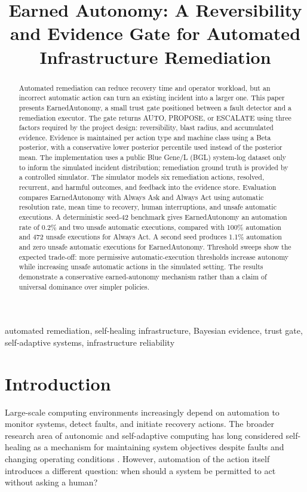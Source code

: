 \documentclass[conference]{IEEEtran}
\title{Earned Autonomy: A Reversibility and Evidence Gate for Automated Infrastructure Remediation}
\author{
\IEEEauthorblockN{Aman Das}
\IEEEauthorblockA{
Earned Autonomy Project\\
Remote, India\\
Supervisor: Kother Badushah
}
}
\begin{document}
\maketitle

\begin{abstract}
Automated remediation can reduce recovery time and operator workload, but an
incorrect automatic action can turn an existing incident into a larger one.
This paper presents EarnedAutonomy, a small trust gate positioned between a
fault detector and a remediation executor. The gate returns AUTO, PROPOSE, or
ESCALATE using three factors required by the project design: reversibility,
blast radius, and accumulated evidence. Evidence is maintained per action type
and machine class using a Beta posterior, with a conservative lower posterior
percentile used instead of the posterior mean. The implementation uses a
public Blue Gene/L (BGL) system-log dataset only to inform the simulated
incident distribution; remediation ground truth is provided by a controlled
simulator. The simulator models six remediation actions, resolved, recurrent,
and harmful outcomes, and feedback into the evidence store. Evaluation compares
EarnedAutonomy with Always Ask and Always Act using automatic resolution rate,
mean time to recovery, human interruptions, and unsafe automatic executions.
A deterministic seed-42 benchmark gives EarnedAutonomy an automation rate of
0.2\% and two unsafe automatic executions, compared with 100\% automation and
472 unsafe executions for Always Act. A second seed produces 1.1\% automation
and zero unsafe automatic executions for EarnedAutonomy. Threshold sweeps show
the expected trade-off: more permissive automatic-execution thresholds increase
autonomy while increasing unsafe automatic actions in the simulated setting.
The results demonstrate a conservative earned-autonomy mechanism rather than a
claim of universal dominance over simpler policies.
\end{abstract}

\begin{IEEEkeywords}
automated remediation, self-healing infrastructure, Bayesian evidence,
trust gate, self-adaptive systems, infrastructure reliability
\end{IEEEkeywords}

\section{Introduction}
Large-scale computing environments increasingly depend on automation to
monitor systems, detect faults, and initiate recovery actions. The broader
research area of autonomic and self-adaptive computing has long considered
self-healing as a mechanism for maintaining system objectives despite faults
and changing operating conditions \cite{kephart,huebscher,macias,krupitzer}.
However, automation of the action itself introduces a different question:
when should a system be permitted to act without asking a human?
\end{document}
